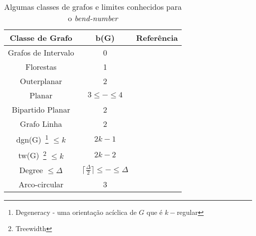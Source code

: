 \begin{table}[h]
\caption{Algumas classes de grafos e limites conhecidos para o \textit{bend-number}}
\label{tab:limitesBenNumber}
\begin{center}
\begin{tabular}{|c|c|c|}
\hline 
Classe de Grafo & b(G) & Referência \\ 
\hline \hline  
Grafos de Intervalo & 0 & \cite{golumbic2009} \\ 
\hline 
Florestas & 1 & \cite{golumbic2009} \\ 
\hline 
Outerplanar & 2 & \cite{daniel2014b} \\ 
\hline 
Planar & $3 \leq - \leq 4$ & \cite{daniel2014b}\\ 
\hline  
Bipartido Planar & 2 & \cite{biedl2010} \\ 
\hline 
Grafo Linha & 2 & \cite{biedl2010} \\ 
\hline 
dgn(G)~\footnote{Degeneracy - uma orientação acíclica de $G$ que é $k-$regular } $\leq k$ & $2k-1$ & \cite{daniel2014b} \\ 
\hline 
tw(G)~\footnote{Treewidth} $\leq k$ & $2k-2$ & \cite{daniel2014b} \\ 
\hline 
Degree $\leq \Delta$ & $ 	\lceil \frac{\Delta}{2}\rceil\leq - \leq\Delta $ & \cite{daniel2014b} \\ 
\hline 
Arco-circular & 3 & \cite{alcon2016} \\ 
\hline 
\end{tabular} 
\end{center}
\end{table}